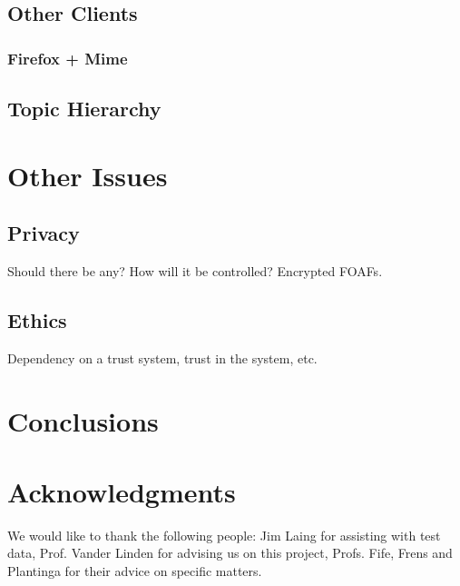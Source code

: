 \documentclass{acm_proc_article-sp}
\begin{document}
\subsection{Other Clients}
\subsubsection{Firefox + Mime}
\subsection{Topic Hierarchy}
\section{Other Issues}
\subsection{Privacy}
Should there be any?  How will it be controlled?
Encrypted FOAFs.

\subsection{Ethics}
Dependency on a trust system, trust in the system, etc.

\section{Conclusions}


\section{Acknowledgments}
We would like to thank the following people:  Jim Laing for assisting with test data, Prof. Vander Linden for advising us on this project, Profs. Fife, Frens and Plantinga for their advice on specific matters.

%

  
%
%

\balancecolumns

\end{document}
